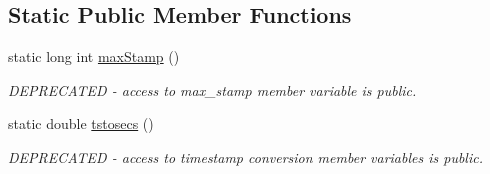 \subsection*{Static Public Member Functions}
\begin{DoxyCompactItemize}
\item 
\mbox{\label{classev_1_1vtsHelper_aa7f1c13eb051773e9413b52bb52caad0}} 
static long int \hyperlink{classev_1_1vtsHelper_aa7f1c13eb051773e9413b52bb52caad0}{max\+Stamp} ()
\begin{DoxyCompactList}\small\item\em D\+E\+P\+R\+E\+C\+A\+T\+ED -\/ access to max\+\_\+stamp member variable is public. \end{DoxyCompactList}\item 
\mbox{\label{classev_1_1vtsHelper_a07d0dc3cd7743eff7d594e838ae23a01}} 
static double \hyperlink{classev_1_1vtsHelper_a07d0dc3cd7743eff7d594e838ae23a01}{tstosecs} ()
\begin{DoxyCompactList}\small\item\em D\+E\+P\+R\+E\+C\+A\+T\+ED -\/ access to timestamp conversion member variables is public. \end{DoxyCompactList}\end{DoxyCompactItemize}
